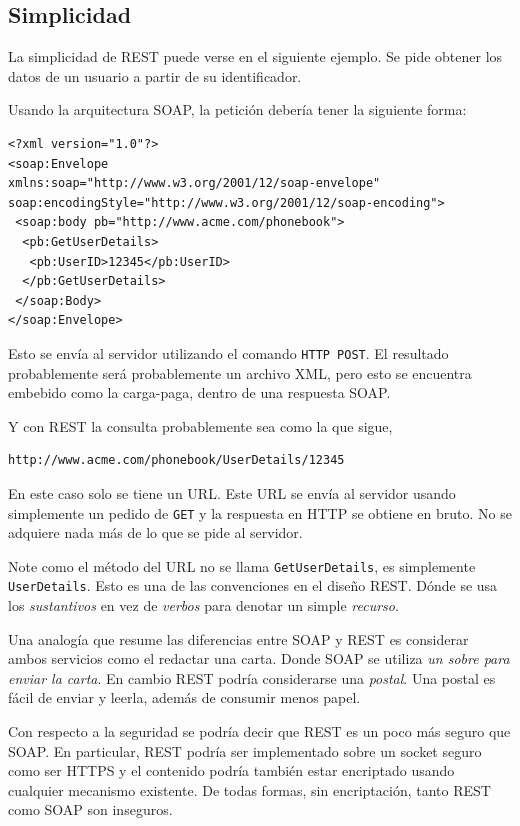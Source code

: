 \documentclass[conference]{IEEEtran}
\begin{document}
\subsection{Simplicidad}
\label{sec:rest-simp}

La simplicidad de REST puede verse en el siguiente ejemplo. Se pide
obtener los datos de un usuario a partir de su identificador. 

Usando la arquitectura SOAP, la petición debería tener la siguiente
forma:
\begin{lstlisting}[frame=single]
<?xml version="1.0"?>
<soap:Envelope
xmlns:soap="http://www.w3.org/2001/12/soap-envelope"
soap:encodingStyle="http://www.w3.org/2001/12/soap-encoding">
 <soap:body pb="http://www.acme.com/phonebook">
  <pb:GetUserDetails>
   <pb:UserID>12345</pb:UserID>
  </pb:GetUserDetails>
 </soap:Body>
</soap:Envelope>
\end{lstlisting}

Esto se envía al servidor utilizando el comando \texttt{HTTP POST}. El
resultado probablemente será probablemente un archivo XML, pero esto
se encuentra embebido como la carga-paga, dentro de una respuesta
SOAP.

Y con REST la consulta probablemente sea como la que sigue,
\begin{lstlisting}[frame=single]
http://www.acme.com/phonebook/UserDetails/12345
\end{lstlisting}

En este caso solo se tiene un URL. Este URL se envía al servidor
usando simplemente un pedido de \texttt{GET} y la respuesta en HTTP se
obtiene en bruto. No se adquiere nada más de lo que se pide al
servidor. 

Note como el método del URL no se llama \texttt{GetUserDetails}, es
simplemente \texttt{UserDetails}. Esto es una de las convenciones en
el diseño REST. Dónde se usa los \emph{sustantivos} en vez de
\emph{verbos} para denotar un simple \emph{recurso}.

Una analogía que resume las diferencias entre SOAP y REST es
considerar ambos servicios como el redactar una carta. Donde SOAP se
utiliza \emph{un sobre para enviar la carta}. En cambio REST podría
considerarse una \emph{postal}. Una postal es fácil de enviar y
leerla, además de consumir menos papel.

Con respecto a la seguridad se podría decir que REST es un poco más
seguro que SOAP. En particular, REST podría ser implementado sobre un
socket seguro como ser HTTPS y el contenido podría también estar
encriptado usando cualquier mecanismo existente. De todas formas, sin
encriptación, tanto REST como SOAP son inseguros. 
\end{document}
